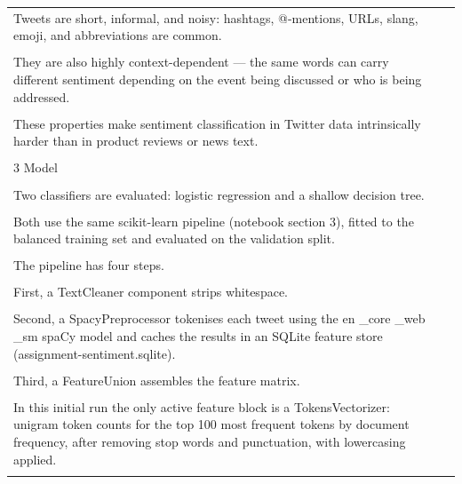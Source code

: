 \documentclass[11pt]{article}
\begin{document}
\begin{longtable}{|p{}|p{}|}
\hline
\rule{0pt}{3.5cm} & \\
\hline
Tweets are short, informal, and noisy: hashtags, @-mentions, URLs, slang, emoji, and abbreviations are common. & \\[2pt]
\hline
\rule{0pt}{3.5cm} & \\
\hline
They are also highly context-dependent --- the same words can carry different sentiment depending on the event being discussed or who is being addressed. & \\[2pt]
\hline
\rule{0pt}{3.5cm} & \\
\hline
These properties make sentiment classification in Twitter data intrinsically harder than in product reviews or news text. & \\[2pt]
\hline
\rule{0pt}{3.5cm} & \\
\hline
3 Model & \\[2pt]
\hline
\rule{0pt}{3.5cm} & \\
\hline
Two classifiers are evaluated: logistic regression and a shallow decision tree. & \\[2pt]
\hline
\rule{0pt}{3.5cm} & \\
\hline
Both use the same scikit-learn pipeline (notebook section 3), fitted to the balanced training set and evaluated on the validation split. & \\[2pt]
\hline
\rule{0pt}{3.5cm} & \\
\hline
The pipeline has four steps. & \\[2pt]
\hline
\rule{0pt}{3.5cm} & \\
\hline
First, a TextCleaner component strips whitespace. & \\[2pt]
\hline
\rule{0pt}{3.5cm} & \\
\hline
Second, a SpacyPreprocessor tokenises each tweet using the en \_core \_web \_sm spaCy model and caches the results in an SQLite feature store (assignment-sentiment.sqlite). & \\[2pt]
\hline
\rule{0pt}{3.5cm} & \\
\hline
Third, a FeatureUnion assembles the feature matrix. & \\[2pt]
\hline
\rule{0pt}{3.5cm} & \\
\hline
In this initial run the only active feature block is a TokensVectorizer: unigram token counts for the top 100 most frequent tokens by document frequency, after removing stop words and punctuation, with lowercasing applied. & \\[2pt]
\hline
\rule{0pt}{3.5cm} & \\

\end{longtable}
\end{document}
